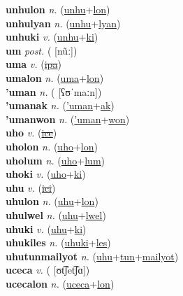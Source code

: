 \textbf{unhulon} \textit{n.} (\hyperref[unhu]{unhu}+\hyperref[lon]{lon})
 \label{unhulon} \\
\textbf{unhulyan} \textit{n.} (\hyperref[unhu]{unhu}+\hyperref[lyan]{lyan})
 \label{unhulyan} \\
\textbf{unhuki} \textit{v.} (\hyperref[unhu]{unhu}+\hyperref[ki]{ki})
 \label{unhuki} \\
\textbf{um} \textit{post.} ( [nũː])
 \label{um} \\
\textbf{uma} \textit{v.} (\hyperref[ipa]{\sout{ipa}})
 \label{uma} \\
\textbf{umalon} \textit{n.} (\hyperref[uma]{uma}+\hyperref[lon]{lon})
 \label{umalon} \\
\textbf{'uman} \textit{n.} ( [ʕʊˈmaːn])
 \label{'uman} \\
\textbf{'umanak} \textit{n.} (\hyperref['uman]{'uman}+\hyperref[ak]{ak})
 \label{'umanak} \\
\textbf{'umanwon} \textit{n.} (\hyperref['uman]{'uman}+\hyperref[won]{won})
 \label{'umanwon} \\
\textbf{uho} \textit{v.} (\hyperref[ice]{\sout{ice}})
 \label{uho} \\
\textbf{uholon} \textit{n.} (\hyperref[uho]{uho}+\hyperref[lon]{lon})
 \label{uholon} \\
\textbf{uholum} \textit{n.} (\hyperref[uho]{uho}+\hyperref[lum]{lum})
 \label{uholum} \\
\textbf{uhoki} \textit{v.} (\hyperref[uho]{uho}+\hyperref[ki]{ki})
 \label{uhoki} \\
\textbf{uhu} \textit{v.} (\hyperref[ici]{\sout{ici}})
 \label{uhu} \\
\textbf{uhulon} \textit{n.} (\hyperref[uhu]{uhu}+\hyperref[lon]{lon})
 \label{uhulon} \\
\textbf{uhulwel} \textit{n.} (\hyperref[uhu]{uhu}+\hyperref[lwel]{lwel})
 \label{uhulwel} \\
\textbf{uhuki} \textit{v.} (\hyperref[uhu]{uhu}+\hyperref[ki]{ki})
 \label{uhuki} \\
\textbf{uhukiles} \textit{n.} (\hyperref[uhuki]{uhuki}+\hyperref[les]{les})
 \label{uhukiles} \\
\textbf{uhutunmailyot} \textit{n.} (\hyperref[uhu]{uhu}+\hyperref[tun]{tun}+\hyperref[mailyot]{mailyot})
 \label{uhutunmailyot} \\
\textbf{uceca} \textit{v.} ( [ʊt͡ʃet͡ʃɑ])
 \label{uceca} \\
\textbf{ucecalon} \textit{n.} (\hyperref[uceca]{uceca}+\hyperref[lon]{lon})
